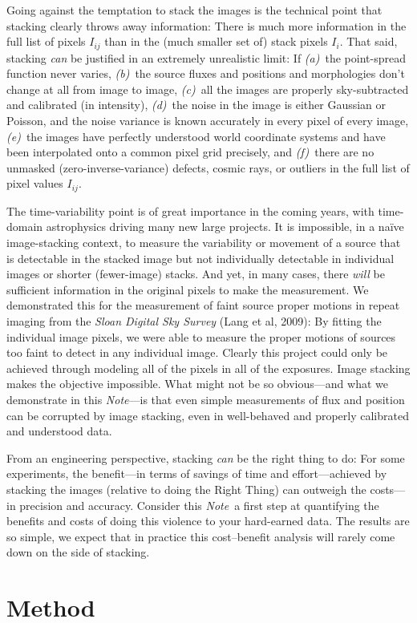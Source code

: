 \documentclass[12pt,preprint]{aastex}
\newcommand{\project}[1]{\textsl{#1}}
\newcommand{\documentname}{\textsl{Note}}
\begin{document}
Going against the temptation to stack the images is the technical
point that stacking clearly throws away information: There is much
more information in the full list of pixels $I_{ij}$ than in the (much
smaller set of) stack pixels $I_i$.  That said, stacking \emph{can} be
justified in an extremely unrealistic limit: If \textsl{(a)}~the
point-spread function never varies, \textsl{(b)}~the source fluxes and
positions and morphologies don't change at all from image to image,
\textsl{(c)}~all the images are properly sky-subtracted and calibrated
(in intensity), \textsl{(d)}~the noise in the image is either Gaussian
or Poisson, and the noise variance is known accurately in every pixel
of every image, \textsl{(e)}~the images have perfectly understood
world coordinate systems and have been interpolated onto a common
pixel grid precisely, and \textsl{(f)}~there are no unmasked
(zero-inverse-variance) defects, cosmic rays, or outliers in the full
list of pixel values $I_{ij}$.

The time-variability point is of great importance in the coming years,
with time-domain astrophysics driving many new large projects.  It is
impossible, in a na\"ive image-stacking context, to measure the
variability or movement of a source that is detectable in the stacked
image but not individually detectable in individual images or shorter
(fewer-image) stacks.  And yet, in many cases, there \emph{will} be
sufficient information in the original pixels to make the measurement.
We demonstrated this for the measurement of faint source proper
motions in repeat imaging from the \project{Sloan Digital Sky Survey}
(Lang et al, 2009): By fitting the individual image pixels, we were
able to measure the proper motions of sources too faint to detect in
any individual image.  Clearly this project could only be achieved
through modeling all of the pixels in all of the exposures.  Image
stacking makes the objective impossible.  What might not be so
obvious---and what we demonstrate in this \documentname---is that even
simple measurements of flux and position can be corrupted by image
stacking, even in well-behaved and properly calibrated and understood
data.

From an engineering perspective, stacking \emph{can} be the right
thing to do: For some experiments, the benefit---in terms of savings
of time and effort---achieved by stacking the images (relative to
doing the Right Thing) can outweigh the costs---in precision and
accuracy.  Consider this \documentname\ a first step at quantifying
the benefits and costs of doing this violence to your hard-earned
data.  The results are so simple, we expect that in practice this
cost--benefit analysis will rarely come down on the side of stacking.

\section{Method}
\end{document}

